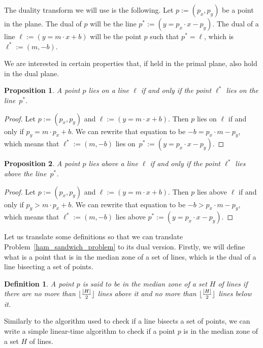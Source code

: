 \documentclass{article}
\DeclarePairedDelimiter\floor{\lfloor}{\rfloor}
\newtheorem{definition}{Definition}
\newtheorem{proposition}{Proposition}
\begin{document}
The duality transform we will use is the following. Let $p:=(p_x,p_y)$ be a point in the plane. The dual of $p$ will be the line $p^*:=(y=p_x \cdot x-p_y)$. The dual of a line $\ell:=(y=m\cdot x+b)$ will be the point $p$ such that $p^*=\ell$, which is $\ell^*:=(m,-b)$.
 
We are interested in certain properties that, if held in the primal plane, also hold in the dual plane. 
  
  
\begin{proposition}\label{dual_lie_proposition}
  A point $p$ lies on a line $\ell$ if and only if the point $\ell^*$ lies on the line~$p^*$.
\end{proposition}
\begin{proof}
  Let $p:=(p_x,p_y)$ and $\ell:=(y=m\cdot x+b)$. Then $p$ lies on $\ell$ if and only if $p_y=m\cdot p_x+b$. 
  We can rewrite that equation to be $-b=p_x \cdot m-p_y$, which means that  $\ell^*:=(m,-b)$ lies on~$p^*:=(y=p_x \cdot x-p_y)$.
\end{proof}
  
\begin{proposition}\label{dual_above_proposition}
  A point $p$ lies above a line $\ell$ if and only if the point $\ell^*$ lies above the line~$p^*$.
\end{proposition}
\begin{proof}
  Let $p:=(p_x,p_y)$ and $\ell:=(y=m\cdot x+b)$. Then $p$ lies above $\ell$ if and only if $p_y>m \cdot p_x+b$. 
  We can rewrite that equation to be $-b>p_x \cdot m-p_y$, which means that  $\ell^*:=(m,-b)$ lies above  $p^*:=(y=p_x \cdot x-p_y)$.
\end{proof}
  
Let us translate some definitions so that we can translate Problem~\ref{ham_sandwich_problem} to its dual version. Firstly, we will define what is a point that is in the median zone of a set of lines, which is the dual of a line bisecting a set of points.
  
\begin{definition}\label{median_zone_definition}
  A point $p$ is said to be in the median zone of a set $H$ of lines 
  if there are no more than $\floor{\frac{|H|}{2}}$ lines above it and no more than $\floor{\frac{|H|}{2}}$ lines below it.
\end{definition}
    
Similarly to the algorithm used to check if a line bisects a set of points, we can write a simple linear-time algorithm to check if a point $p$ is in the median zone of a set $H$ of lines.
    
\end{document}
